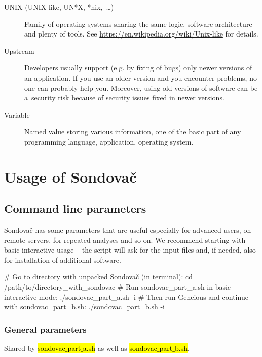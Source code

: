 \documentclass[a4paper, 11pt, twoside]{article}
\renewcommand{\texttt}[1]{\hl{\ttfamily #1}}
\begin{document}
\begin{description}
  \item[UNIX (UNIX-like, UN*X, *nix,~\ldots)] Family of operating systems sharing the same logic, software architecture and plenty of tools. See \url{https://en.wikipedia.org/wiki/Unix-like} for details.
  \item[Upstream] Developers usually support (e.g. by fixing of bugs) only newer versions of an application. If you use an older version and you encounter problems, no one can probably help you. Moreover, using old versions of software can be a~security risk because of security issues fixed in newer versions.
  \item[Variable] Named value storing various information, one of the basic part of any programming language, application, operating system.
\end{description}

\section{Usage of Sondovač}
\label{script-usage}

\subsection{Command line parameters}

Sondovač has some parameters that are useful especially for advanced users, on remote servers, for repeated analyses and so on. We recommend starting with basic interactive usage -- the script will ask for the input files and, if needed, also for installation of additional software.

\begin{bashcode}
  # Go to directory with unpacked Sondovač (in terminal):
  cd /path/to/directory_with_sondovac
  # Run sondovac_part_a.sh in basic interactive mode:
  ./sondovac_part_a.sh -i
  # Then run Geneious and continue with sondovac_part_b.sh:
  ./sondovac_part_b.sh -i
\end{bashcode}

\subsubsection{General parameters}

Shared by \texttt{sondovac$\_$part$\_$a.sh} as well as \texttt{sondovac$\_$part$\_$b.sh}.
\end{document}
